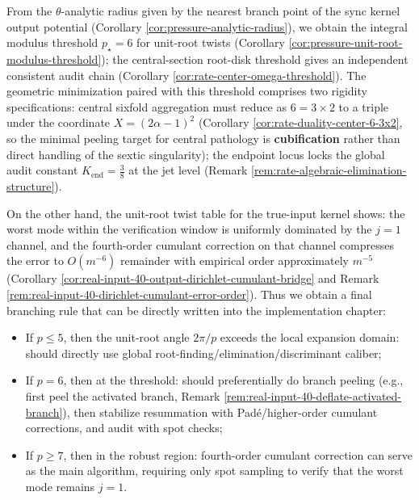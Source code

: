 



\begin{remark}[Final algorithm specification: modulus threshold \texorpdfstring{$p_\star=6$}{p*=6}, cubic peeling and endpoint audit constant]\label{rem:unit-root-final-spec}
From the \(\theta\)-analytic radius given by the nearest branch point of the sync kernel output potential (Corollary \ref{cor:pressure-analytic-radius}), we obtain the integral modulus threshold \(p_\star=6\) for unit-root twists (Corollary \ref{cor:pressure-unit-root-modulus-threshold}); the central-section root-disk threshold gives an independent consistent audit chain (Corollary \ref{cor:rate-center-omega-threshold}).
The geometric minimization paired with this threshold comprises two rigidity specifications: central sixfold aggregation must reduce as \(6=3\times 2\) to a triple under the coordinate \(X=(2\alpha-1)^2\) (Corollary \ref{cor:rate-duality-center-6-3x2}, so the minimal peeling target for central pathology is \textbf{cubification} rather than direct handling of the sextic singularity); the endpoint locus locks the global audit constant \(K_{\mathrm{end}}=\tfrac38\) at the jet level (Remark \ref{rem:rate-algebraic-elimination-structure}).
\par
On the other hand, the unit-root twist table for the true-input kernel shows: the worst mode within the verification window is uniformly dominated by the \(j=1\) channel, and the fourth-order cumulant correction on that channel compresses the error to \(O(m^{-6})\) remainder with empirical order approximately \(m^{-5}\) (Corollary \ref{cor:real-input-40-output-dirichlet-cumulant-bridge} and Remark \ref{rem:real-input-40-dirichlet-cumulant-error-order}).
Thus we obtain a final branching rule that can be directly written into the implementation chapter:
\begin{itemize}
  \item If \(p\le 5\), then the unit-root angle \(2\pi/p\) exceeds the local expansion domain: should directly use global root-finding/elimination/discriminant caliber;
  \item If \(p=6\), then at the threshold: should preferentially do branch peeling (e.g., first peel the activated branch, Remark \ref{rem:real-input-40-deflate-activated-branch}), then stabilize resummation with Padé/higher-order cumulant corrections, and audit with spot checks;
  \item If \(p\ge 7\), then in the robust region: fourth-order cumulant correction can serve as the main algorithm, requiring only spot sampling to verify that the worst mode remains \(j=1\).
\end{itemize}
\end{remark}

